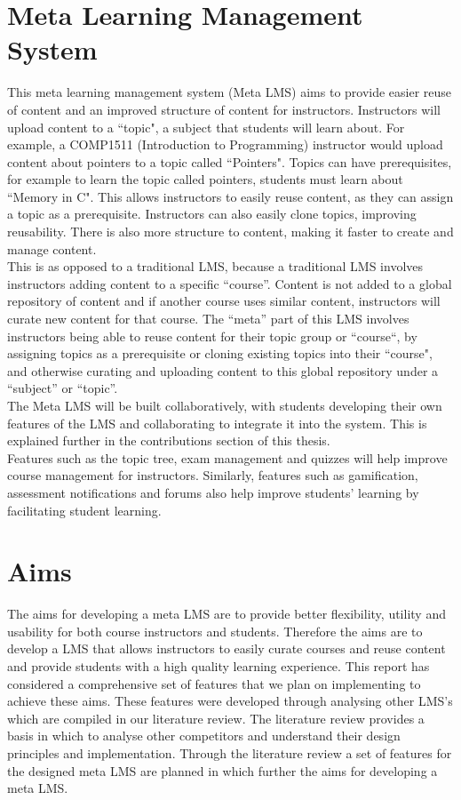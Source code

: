 \section{Meta Learning Management System}
This meta learning management system (Meta LMS) aims to provide easier reuse of content and an improved structure of content for instructors. Instructors will upload content to a ``topic", a subject that students will learn about. For example, a COMP1511 (Introduction to Programming) instructor would upload content about pointers to a topic called ``Pointers". Topics can have prerequisites, for example to learn the topic called pointers, students must learn about ``Memory in C". This allows instructors to easily reuse content, as they can assign a topic as a prerequisite. Instructors can also easily clone topics, improving reusability. There is also more structure to content, making it faster to create and manage content.\\

This is as opposed to a traditional LMS, because a traditional LMS involves instructors adding content to a specific ``course''. Content is not added to a global repository of content and if another course uses similar content, instructors will curate new content for that course. The ``meta'' part of this LMS involves instructors being able to reuse content for their topic group or ``course``, by assigning topics as a prerequisite or cloning existing topics into their ``course", and otherwise curating and uploading content to this global repository under a ``subject'' or ``topic''.\\

The Meta LMS will be built collaboratively, with students developing their own features of the LMS and collaborating to integrate it into the system. This is explained further in the contributions section of this thesis. \\
Features such as the topic tree, exam management and quizzes will help improve course management for instructors. Similarly, features such as gamification, assessment notifications and forums also help improve students' learning by facilitating student learning.\\

\section{Aims}
The aims for developing a meta LMS are to provide better flexibility, utility and usability for both course instructors and students. 
Therefore the aims are to develop a LMS that allows instructors to easily curate courses and reuse content and provide students with a high quality learning experience. 
This report has considered a comprehensive set of features that we plan on implementing to achieve these aims. 
These features were developed through analysing other LMS’s which are compiled in our literature review.
The literature review provides a basis in which to analyse other competitors and understand their design principles and implementation.
Through the literature review a set of features for the designed meta LMS are planned in which further the aims for developing a meta LMS.

